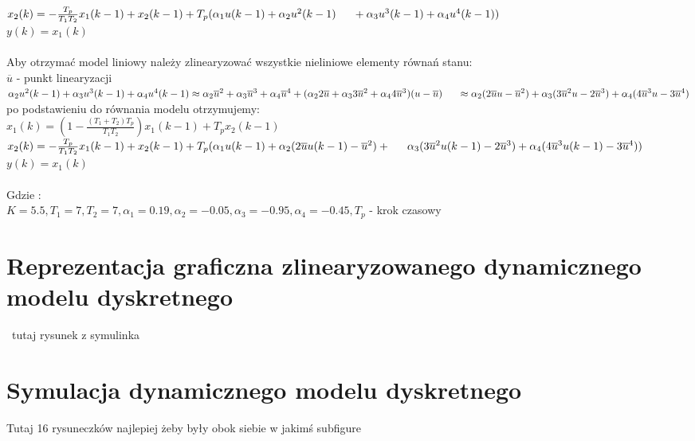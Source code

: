 \documentclass[a4paper, 11pt]{article}
\begin{document}
$x_2(k) = - \frac{T_p}{T_1T_2}x_1(k-1) + x_2(k-1) + T_p(\alpha_1u(k-1)+\alpha_2u^2(k-1)\\
	\indent	+ \alpha_3u^3(k-1)+\alpha_4u^4(k-1))$
\\

$y(k) = x_1(k)$
\\
\\

\noindent Aby otrzymać model liniowy należy zlinearyzować wszystkie nieliniowe elementy równań stanu:
\\

$\overline{u}$ - punkt linearyzacji 
\\

$\alpha_2u^2(k-1)+ \alpha_3u^3(k-1)+\alpha_4u^4(k-1) \approx \alpha_2\overline{u}^2 + \alpha_3\overline{u}^3 + \alpha_4\overline{u}^4 + (\alpha_22\overline{u} + \alpha_33\overline{u}^2 + \alpha_44\overline{u}^3)(u-\overline{u})  \\ \indent \approx \alpha_2(2\overline{u}u - \overline{u}^2)+ \alpha_3(3\overline{u}^2u-2\overline{u}^3) + \alpha_4(4\overline{u}^3u - 3\overline{u}^4)$
\\

\noindent po podstawieniu do równania modelu otrzymujemy: 
\\

$x_1(k) =(1-\frac{(T_1 + T_2)T_p}{T_1T_2})x_1(k-1)+T_px_2(k-1) $
\\

$x_2(k) = - \frac{T_p}{T_1T_2}x_1(k-1) + x_2(k-1) + T_p(\alpha_1u(k-1)+\alpha_2(2\overline{u}u(k-1) - \overline{u}^2)+
\\ \indent \alpha_3(3\overline{u}^2u(k-1)-2\overline{u}^3) + \alpha_4(4\overline{u}^3u(k-1) - 3\overline{u}^4))$
\\

$y(k) = x_1(k)$\\
\\
Gdzie : \\

$K  = 5.5, T_1 = 7, T_2 = 7, \alpha_1 = 0.19, \alpha_2 = -0.05, \alpha_3 = -0.95, \alpha_4 = -0.45, T_p$ - krok czasowy
\\

\section{Reprezentacja graficzna zlinearyzowanego dynamicznego modelu dyskretnego}\
tutaj rysunek z symulinka

\section{Symulacja dynamicznego modelu dyskretnego}
Tutaj 16 rysuneczków najlepiej żeby były obok siebie w jakimś subfigure
\end{document}
